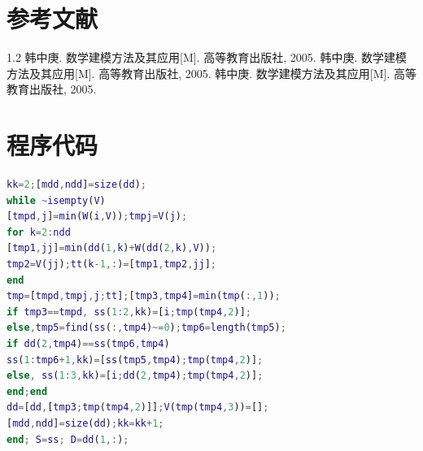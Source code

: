 \documentclass[bwprint]{gmcmthesis}
\numberwithin{figure}{section}
\begin{document}
%
\newpage
\section{参考文献}
\begin{thebibliography}{1.2}%
\setlength{\itemsep}{-2mm}
 韩中庚. 数学建模方法及其应用[M]. 高等教育出版社, 2005.
 韩中庚. 数学建模方法及其应用[M]. 高等教育出版社, 2005.
 韩中庚. 数学建模方法及其应用[M]. 高等教育出版社, 2005.
\end{thebibliography}

\newpage
\appendix
\section{程序代码}
\begin{lstlisting}[language=Matlab] 
kk=2;[mdd,ndd]=size(dd);
while ~isempty(V)
[tmpd,j]=min(W(i,V));tmpj=V(j);
for k=2:ndd
[tmp1,jj]=min(dd(1,k)+W(dd(2,k),V));
tmp2=V(jj);tt(k-1,:)=[tmp1,tmp2,jj];
end
tmp=[tmpd,tmpj,j;tt];[tmp3,tmp4]=min(tmp(:,1));
if tmp3==tmpd, ss(1:2,kk)=[i;tmp(tmp4,2)];
else,tmp5=find(ss(:,tmp4)~=0);tmp6=length(tmp5);
if dd(2,tmp4)==ss(tmp6,tmp4)
ss(1:tmp6+1,kk)=[ss(tmp5,tmp4);tmp(tmp4,2)];
else, ss(1:3,kk)=[i;dd(2,tmp4);tmp(tmp4,2)];
end;end
dd=[dd,[tmp3;tmp(tmp4,2)]];V(tmp(tmp4,3))=[];
[mdd,ndd]=size(dd);kk=kk+1;
end; S=ss; D=dd(1,:);
 \end{lstlisting}
\end{document}
